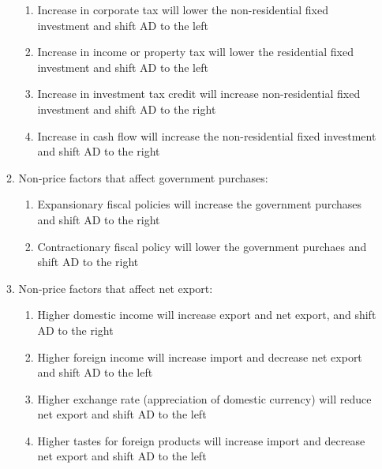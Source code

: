 \documentclass[12pt]{article}
\begin{document}
\begin{enumerate}
\begin{enumerate}
\begin{enumerate}
              \item Increase in corporate tax will lower the non-residential fixed investment and shift AD to the left

              \item Increase in income or property tax will lower the residential fixed investment and shift AD to the left

              \item Increase in investment tax credit will increase non-residential fixed investment and shift AD to the right

              \item Increase in cash flow will increase the non-residential fixed investment and shift AD to the right

            \end{enumerate}

          \item Non-price factors that affect government purchases:

            \begin{enumerate}

              \item Expansionary fiscal policies will increase the government purchases and shift AD to the right

              \item Contractionary fiscal policy will lower the government purchaes and shift AD to the right

            \end{enumerate}

          \item Non-price factors that affect net export:

            \begin{enumerate}

              \item Higher domestic income will increase export and net export, and shift AD to the right

              \item Higher foreign income will increase import and decrease net export and shift AD to the left

              \item Higher exchange rate (appreciation of domestic currency) will reduce net export and shift AD to the left

              \item Higher tastes for foreign products will increase import and decrease net export and shift AD to the left


\end{enumerate}
\end{enumerate}
\end{enumerate}
\end{document}
